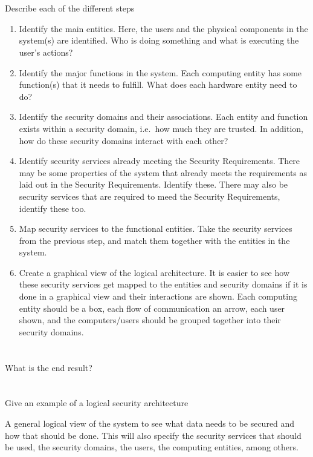 \begin{questions}
\begin{parts}
  \part{} Describe each of the different steps
    \begin{solution}
      \begin{enumerate}[noitemsep]
      \item Identify the main entities.
        Here, the users and the physical components in the system(s) are identified.
        Who is doing something and what is executing the user's actions?
      \item Identify the major functions in the system.
        Each computing entity has some function(s) that it needs to fulfill.
        What does each hardware entity need to do?
      \item Identify the security domains and their associations.
        Each entity and function exists within a security domain, i.e.\ how much they are trusted.
        In addition, how do these security domains interact with each other?
      \item Identify security services already meeting the Security Requirements.
        There may be some properties of the system that already meets the requirements as laid out in the Security Requirements.
        Identify these.
        There may also be security services that are required to meed the Security Requirements, identify these too.
      \item Map security services to the functional entities.
        Take the security services from the previous step, and match them together with the entities in the system.
      \item Create a graphical view of the logical architecture.
        It is easier to see how these security services get mapped to the entities and security domains if it is done in a graphical view and their interactions are shown.
        Each computing entity should be a box, each flow of communication an arrow, each user shown, and the computers/users should be grouped together into their security domains.
      \end{enumerate}
    \end{solution}

  \part{} What is the end result?
  \part{} Give an example of a logical security architecture
    \begin{solution}
      A general logical view of the system to see what data needs to be secured and how that should be done.
      This will also specify the security services that should be used, the security domains, the users, the computing entities, among others.
    \end{solution}


\end{parts}
\end{questions}
